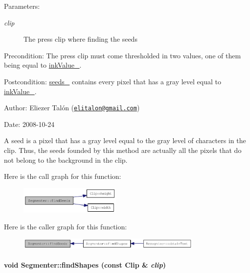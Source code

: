 \begin{Desc}
\item[Parameters:]
\begin{description}
\item[{\em clip}]The press clip where finding the seeds\end{description}
\end{Desc}
\begin{Desc}
\item[Precondition:]The press clip must come thresholded in two values, one of them being equal to \hyperlink{class_segmenter_fa6183f99aa6011399783652b341a43b}{inkValue\_\-}.\end{Desc}
\begin{Desc}
\item[Postcondition:]\hyperlink{class_segmenter_7859d050250b9fdf7c96374f80008d6e}{seeds\_\-} contains every pixel that has a gray level equal to \hyperlink{class_segmenter_fa6183f99aa6011399783652b341a43b}{inkValue\_\-}.\end{Desc}
\begin{Desc}
\item[Author:]Eliezer Talón (\href{mailto:elitalon@gmail.com}{\tt elitalon@gmail.com}) \end{Desc}
\begin{Desc}
\item[Date:]2008-10-24\end{Desc}
A seed is a pixel that has a gray level equal to the gray level of characters in the clip. Thus, the seeds founded by this method are actually all the pixels that do not belong to the background in the clip. 

Here is the call graph for this function:\nopagebreak
\begin{figure}[H]
\begin{center}
\leavevmode
\includegraphics[width=142pt]{class_segmenter_bacab187b543a51c5322c01fc0a29ffb_cgraph}
\end{center}
\end{figure}


Here is the caller graph for this function:\nopagebreak
\begin{figure}[H]
\begin{center}
\leavevmode
\includegraphics[width=259pt]{class_segmenter_bacab187b543a51c5322c01fc0a29ffb_icgraph}
\end{center}
\end{figure}
\hypertarget{class_segmenter_465c8e755bb56d247add080a04377520}{
\paragraph[{findShapes}]{\setlength{\rightskip}{0pt plus 5cm}void Segmenter::findShapes (const {\bf Clip} \& {\em clip})}\hfill}
\label{class_segmenter_465c8e755bb56d247add080a04377520}


